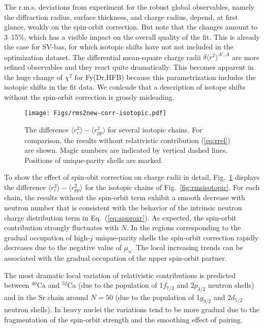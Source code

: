 \documentclass[aps,prc,twocolumn,floatfix,nofootinbib,preprintnumbers,superscriptaddress,longbibliography]{revtex4-1}
\begin{document}
The  r.m.s. deviations from experiment for the robust global observables, namely the
diffraction radius, surface thickness, and charge radius, depend, at first glance, weakly on  the spin-orbit correction. But note that the changes amount to 3--15\%,  which has a visible  impact on the overall
quality of the fit. This is already the case   for SV-bas, for which isotopic shifts have not  not included in the optimization dataset.
The differential mean-square  charge radii 
$\delta\langle r^2\rangle^{A',A}$ 
are more refined observables and they react quite dramatically. 
This becomes apparent in the huge change of $\chi^2$ for Fy(Dr,HFB) because this parametrization includes
the isotopic shifts in the fit data.
We conlcude that a description of isotope shifts without the spin-orbit correction is grossly misleading. 

 
\begin{figure}[htb]
\texttt{[image: Figs/rms2new-corr-isotopic.pdf]}
\caption{The difference  $\langle r^2_c\rangle -\langle r^2_{pp}\rangle$ for several isotopic chains. For comparison, the results  without relativistic contribution (\ref{eq:rrel}) are shown.  Magic  numbers are indicated by vertical dashed lines. Positions of unique-parity shells are marked.}
\label{fig:trendsN}
\end{figure}



To show  the effect of spin-obit correction on charge radii in detail, Fig.~\ref{fig:trendsN} displays the difference  $\langle r^2_c\rangle -\langle r^2_{pp}\rangle$ for the isotopic chains of Fig.~\ref{fig:rmsisotopic}. For each chain, the results without the spin-orbit term exhibit a smooth decrease with neutron number that is consistent with the behavior of the intrinsic neutron charge distribution term in Eq.~(\ref{eq:approxr}).
As expected, the  spin-orbit contribution strongly fluctuates with $N$. In the regions corresponding to the gradual occupation of high-$j$ unique-parity shells the spin-orbit correction
rapidly decreases due to the negative value of $\mu_n$. The local increasing trends can be associated with the gradual occupation of the upper spin-orbit partner.  

The most dramatic local variation  of relativistic contributions is predicted between $^{40}$Ca and $^{52}$Ca (due to the population of 1$f_{7/2}$ and 2$p_{3/2}$ neutron shells)
and in the Sr chain around $N=50$  (due to the population of 1$g_{9/2}$ and 2$d_{5/2}$ neutron shells). In heavy nuclei the variations tend to be more gradual due to the fragmentation of the spin-orbit strength and the smoothing effect of pairing.
\end{document}
